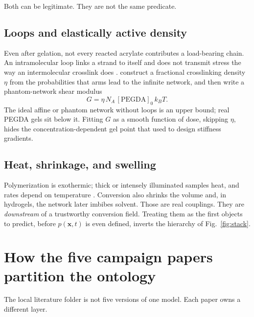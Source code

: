 \documentclass[11pt,a4paper]{article}
\begin{document}
Both can be legitimate.
They are not the same predicate.

\subsection{Loops and elastically active density}

Even after gelation, not every reacted acrylate contributes a load-bearing chain.
An intramolecular loop links a strand to itself and does not transmit stress the way an intermolecular crosslink does \citep{Zhong2016,Zhu2020}.
\citet{Zhu2020} construct a fractional crosslinking density $\eta$ from the probabilities that arms lead to the infinite network, and then write a phantom-network shear modulus
\begin{equation}
  G = \eta\,N_A\,[\mathrm{PEGDA}]_0\,k_B T.
  \label{eq:G}
\end{equation}
The ideal affine or phantom network without loops is an upper bound; real PEGDA gels sit below it.
Fitting $G$ as a smooth function of dose, skipping $\eta$, hides the concentration-dependent gel point that \citet{Zhu2020} used to design stiffness gradients.

\subsection{Heat, shrinkage, and swelling}

Polymerization is exothermic; thick or intensely illuminated samples heat, and rates depend on temperature \citep{Goodner2002,Dobson2024}.
Conversion also shrinks the volume and, in hydrogels, the network later imbibes solvent.
Those are real couplings.
They are \emph{downstream} of a trustworthy conversion field.
Treating them as the first objects to predict, before $p(\mathbf{x},t)$ is even defined, inverts the hierarchy of Fig.~\ref{fig:stack}.

\section{How the five campaign papers partition the ontology}

The local literature folder is not five versions of one model.
Each paper owns a different layer.
\end{document}
